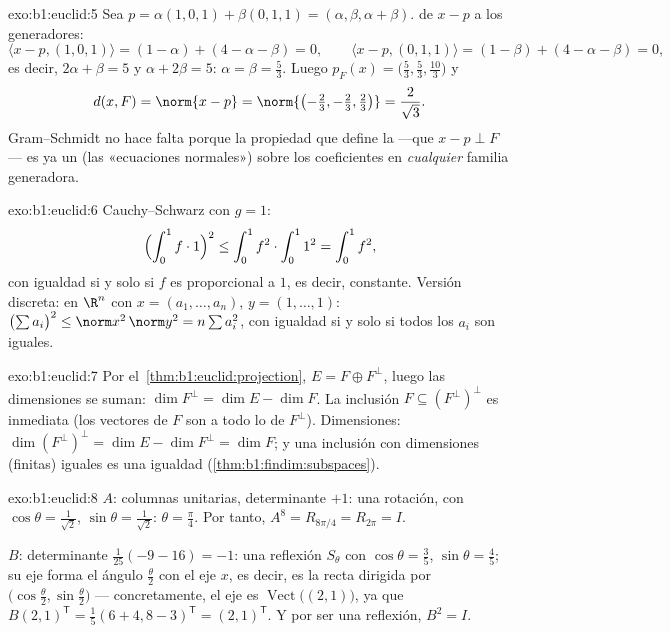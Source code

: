 \begin{solution}{exo:b1:euclid:5}
Sea $p = \alpha(1,0,1) + \beta(0,1,1) = (\alpha, \beta, \alpha +
\beta)$.  de $x - p$ a los generadores:
\[
\langle x - p, (1,0,1)\rangle = (1 - \alpha) + (4 - \alpha - \beta)
= 0,
\qquad
\langle x - p, (0,1,1)\rangle = (1 - \beta) + (4 - \alpha - \beta)
= 0,
\]
es decir, $2\alpha + \beta = 5$ y $\alpha + 2\beta = 5$:
$\alpha = \beta = \frac53$. Luego
$p_F(x) = \bigl(\frac53, \frac53, \frac{10}{3}\bigr)$ y
\[
d(x, F) = \norm{x - p} =
\norm{\bigl(-\tfrac23, -\tfrac23, \tfrac23\bigr)} =
\frac{2}{\sqrt 3} .
\]
Gram--Schmidt no hace falta porque la propiedad que define la
 ---que $x - p \perp F$--- es ya un 
(las «ecuaciones normales») sobre los coeficientes en \emph{cualquier}
familia generadora.
\end{solution}

\begin{solution}{exo:b1:euclid:6}
Cauchy--Schwarz con $g = 1$:
\[
\Bigl(\int_0^1 f \cdot 1\Bigr)^2 \leq \int_0^1 f^2 \cdot \int_0^1
1^2 = \int_0^1 f^2 ,
\]
con igualdad si y solo si $f$ es proporcional a $1$, es decir,
constante. Versión discreta: en $\R^n$ con $x = (a_1, \dots, a_n)$,
$y = (1, \dots, 1)$:
$\bigl(\sum a_i\bigr)^2 \leq \norm x^2\, \norm y^2 = n \sum a_i^2$,
con igualdad si y solo si todos los $a_i$ son iguales.
\end{solution}

\begin{solution}{exo:b1:euclid:7}
Por el~\cref{thm:b1:euclid:projection}, $E = F \oplus F^\perp$, luego
las dimensiones se suman: $\dim F^\perp = \dim E - \dim F$. La
inclusión $F \subseteq (F^\perp)^\perp$ es inmediata (los vectores de
$F$ son  a todo lo de $F^\perp$). Dimensiones:
$\dim(F^\perp)^\perp = \dim E - \dim F^\perp = \dim F$; y una
inclusión con dimensiones (finitas) iguales es una igualdad
(\cref{thm:b1:findim:subspaces}).
\end{solution}

\begin{solution}{exo:b1:euclid:8}
$A$: columnas unitarias, determinante $+1$: una rotación, con
$\cos\theta = \frac{1}{\sqrt2}$, $\sin\theta = \frac{1}{\sqrt2}$:
$\theta = \frac\pi4$. Por tanto, $A^8 = R_{8\pi/4} = R_{2\pi} = I$.

$B$: determinante $\frac{1}{25}(-9 - 16) = -1$: una reflexión
$S_\theta$ con $\cos\theta = \frac35$, $\sin\theta = \frac45$; su eje
forma el ángulo $\frac\theta2$ con el eje $x$, es decir, es la recta
dirigida por $\bigl(\cos\frac\theta2, \sin\frac\theta2\bigr)$ ---
concretamente, el eje es $\operatorname{Vect}\bigl((2, 1)\bigr)$, ya
que $B(2,1)^{\mathsf T} = \frac15(6+4, 8-3)^{\mathsf T} =
(2,1)^{\mathsf T}$. Y por ser una reflexión, $B^2 = I$.
\end{solution}


